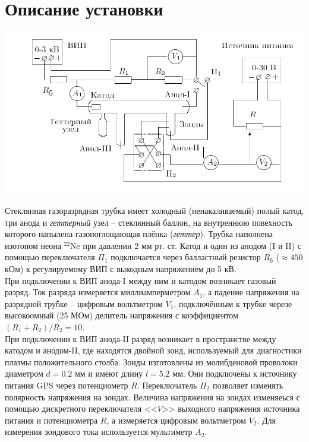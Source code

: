 \section*{Описание установки}
\begin{center}
    \includegraphics[scale=0.4]{setup.png}
\end{center}
\par Стеклянная газоразрядная трубка имеет холодный (ненакаливаемый) полый катод, три анода и \textit{геттерный} узел -- стеклянный баллон, на внутреннюю повехность которого напылена газопоглощающая плёнка (\textit{геттер}). Трубка наполнена изотопом неона $^{22}$Ne при давлении 2 мм рт. ст. Катод и один из анодом (I и II) с помощью переключателя $\Pi_1$ подключается через балластный резистор $R_\text{б}$ ($\approx 450$ кОм) к регулируемому ВИП с выкодным напряжением до 5 кВ.\\
При подключении к ВИП анода-I между ним и катодом возникает газовый разряд. Ток разряда измеряется миллиамперметром $A_1$, а падение напряжения на разрядной трубке -- цифровым вольтметром $V_1$, подключённым к трубке черезе высокоомный (25 МОм) делитель напряжения с коэффициентом $(R_1+R_2)/R_2 = 10$. \\
При подключении к ВИП анода-II разряд возникает в пространстве между катодом и анодом-II, где находятся двойной зонд, используемый для диагностики плазмы положительного столба. Зонды изготовлены из молибденовой проволоки диаметром $d = 0.2$ мм и имеют длину $l = 5.2$ мм. Они подключены к источнику питания GPS через потенциометр $R$. Переключатель $\Pi_2$ позволяет изменять полярность напряжения на зондах. Величина напряжения на зондах изменяеься с помощью дискретного переключателя <<$V$>> выходного напряжения источника питания и потенциометра $R$, а измеряется цифровым вольтметром $V_2$. Для измерения зондового тока используется мультиметр $A_2$.

